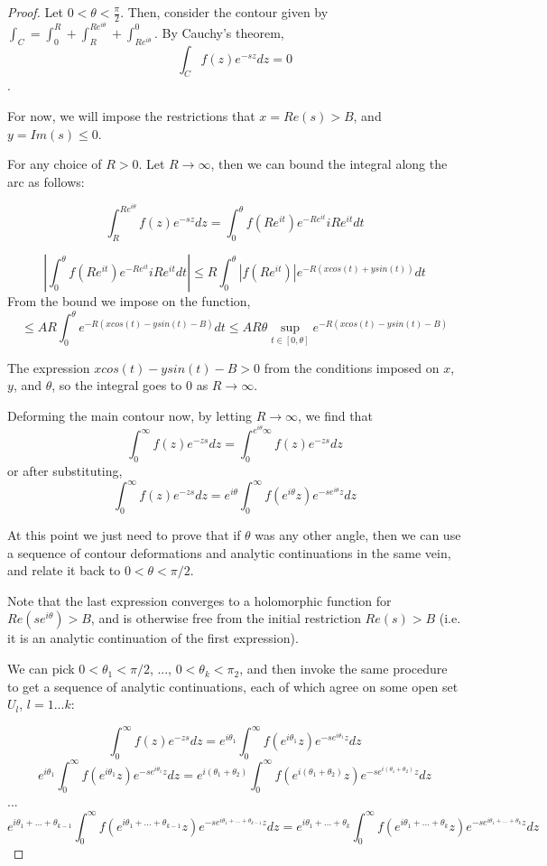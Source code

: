\documentclass{article}
\begin{document}
	\begin{proof}
		Let $ 0 < \theta < \frac{\pi}{2}$. Then, consider the contour given by $\int_{C} = \int_{0}^{R} + \int_{R}^{R e^{i \theta}} + \int_{R e^{i \theta}}^{0}$.
		By Cauchy's theorem,
		$$ \int_{C} f(z) e^{-sz} dz = 0 $$.
		
		For now, we will impose the restrictions that $x = Re(s) > B$, and $y = Im(s) \leq 0$. 
		
		For any choice of $R>0$. Let $R \rightarrow \infty$, then we can bound the integral along the arc as follows:
		
		$$ \int_{R}^{R e^{i \theta}} f(z) e^{-sz} dz = \int_{0}^{\theta} f(R e^{i t}) e^{-R e^{i t} } i R e^{i t} dt $$
		
		$$ \left| \int_{0}^{\theta} f(R e^{i t}) e^{-R e^{i t} } i R e^{i t} dt \right| \leq R \int_{0}^{\theta} \left| f(R e^{i t}) \right| e^{-R \left( x cos(t) + y sin(t) \right)} dt $$
		From the bound we impose on the function,
		$$ \leq A R \int_{0}^{\theta} e^{-R \left( x cos(t) - y sin(t) - B \right)} dt \leq A R \theta \sup_{t \in \left[ 0, \theta \right]}  e^{-R \left( x cos(t) - y sin(t) - B \right)} $$
		
		The expression $x cos(t) - y sin(t) - B > 0$ from the conditions imposed on $x$, $y$, and $\theta$, so the integral goes to $0$ as $R \rightarrow \infty$.
		
		Deforming the main contour now, by letting $R \rightarrow \infty$, we find that
		$$ \int_{0}^{\infty} f(z) e^{-zs} dz = \int_{0}^{ e^{i \theta} \infty} f(z) e^{-zs} dz $$
		or after substituting, 
		$$ \int_{0}^{\infty} f(z) e^{-zs} dz = e^{i \theta} \int_{0}^{\infty} f(e^{i \theta} z) e^{-s e^{i \theta} z} dz $$
		
		At this point we just need to prove that if $\theta$ was any other angle, then we can use a sequence of contour deformations and analytic continuations in the same vein, and relate it back to $0 < \theta < \pi/2$. 
		
		Note that the last expression converges to a holomorphic function for $Re(s e^{i \theta}) > B$, and is otherwise free from the initial restriction $ Re(s) > B $ (i.e. it is an analytic continuation of the first expression). 
		
		We can pick $ 0 < \theta_1 < \pi/2 $, ..., $ 0 < \theta_k < \pi_2 $, and then invoke the same procedure to get a sequence of analytic continuations, each of which agree on some open set $U_l$, $l = 1 ... k$:
		
		$$ \int_{0}^{\infty} f(z) e^{-zs} dz = e^{i \theta_1} \int_{0}^{\infty} f(e^{i \theta_1} z) e^{-s e^{i \theta_1} z} dz $$
		$$ e^{i \theta_1} \int_{0}^{\infty} f(e^{i \theta_1} z) e^{-s e^{i \theta_1} z} dz = e^{i \left( \theta_1 + \theta_2 \right)} \int_{0}^{\infty} f( e^{i \left( \theta_1 + \theta_2 \right)} z) e^{ -s e^{i \left( \theta_1 + \theta_2 \right)} z} dz $$
		...
		$$ e^{i \theta_1 + ... + \theta_{k-1} } \int_{0}^{\infty} f( e^{i \theta_1 + ... + \theta_{k-1} } z) e^{-s e^{i \theta_1 + ... + \theta_{k-1} } z} dz = e^{i \theta_1 + ... + \theta_{k} } \int_{0}^{\infty} f( e^{i \theta_1 + ... + \theta_{k} } z) e^{ -s e^{i \theta_1 + ... + \theta_{k} } z} dz $$
		

\end{proof}
\end{document}
